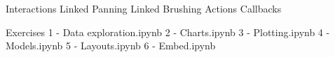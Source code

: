 
\begin{frame}

Interactions
  Linked Panning
  Linked Brushing
  Actions
  Callbacks


\end{frame}
\begin{frame}
Exercises
1 - Data exploration.ipynb
2 - Charts.ipynb
3 - Plotting.ipynb
4 - Models.ipynb
5 - Layouts.ipynb
6 - Embed.ipynb
\end{frame}
